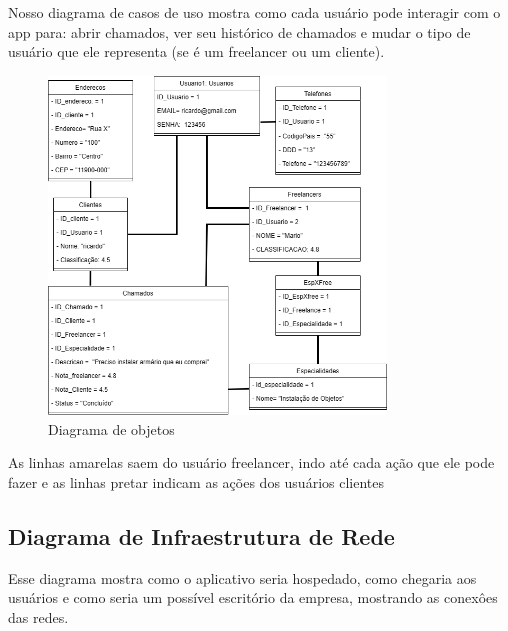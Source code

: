 \documentclass[
  a4paper,%
  12pt,%
  english,%
  brazilian,%
]{article}
\begin{document}
    Nosso diagrama de casos de uso mostra como cada usuário pode interagir com o app para: abrir chamados, ver seu histórico de chamados e mudar o tipo de usuário que ele representa (se é um freelancer ou um cliente).

\begin{figure}[h]
\centering
\caption{Diagrama de objetos}%
\label{fig:diagrama-objetos}
 \includegraphics[width=0.8\textwidth]{fotos/DiagramaObjetopi.png}
\end{figure}

    As linhas amarelas saem do usuário freelancer, indo até cada ação que ele pode fazer e as linhas pretar indicam as ações dos usuários clientes

\break
    
\subsection*{Diagrama de Infraestrutura de Rede}

    Esse diagrama mostra como o aplicativo seria hospedado, como chegaria aos usuários e como seria um possível escritório da empresa, mostrando as conexôes das redes.
\end{document}
